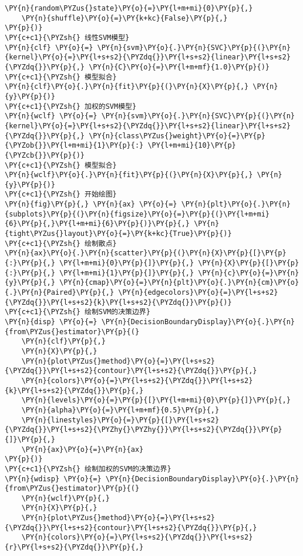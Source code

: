 \begin{Verbatim}[commandchars=\\\{\}]
    \PY{n}{random\PYZus{}state}\PY{o}{=}\PY{l+m+mi}{0}\PY{p}{,}
    \PY{n}{shuffle}\PY{o}{=}\PY{k+kc}{False}\PY{p}{,}
\PY{p}{)}
\PY{c+c1}{\PYZsh{} 线性SVM模型}
\PY{n}{clf} \PY{o}{=} \PY{n}{svm}\PY{o}{.}\PY{n}{SVC}\PY{p}{(}\PY{n}{kernel}\PY{o}{=}\PY{l+s+s2}{\PYZdq{}}\PY{l+s+s2}{linear}\PY{l+s+s2}{\PYZdq{}}\PY{p}{,} \PY{n}{C}\PY{o}{=}\PY{l+m+mf}{1.0}\PY{p}{)}
\PY{c+c1}{\PYZsh{} 模型拟合}
\PY{n}{clf}\PY{o}{.}\PY{n}{fit}\PY{p}{(}\PY{n}{X}\PY{p}{,} \PY{n}{y}\PY{p}{)}
\PY{c+c1}{\PYZsh{} 加权的SVM模型}
\PY{n}{wclf} \PY{o}{=} \PY{n}{svm}\PY{o}{.}\PY{n}{SVC}\PY{p}{(}\PY{n}{kernel}\PY{o}{=}\PY{l+s+s2}{\PYZdq{}}\PY{l+s+s2}{linear}\PY{l+s+s2}{\PYZdq{}}\PY{p}{,} \PY{n}{class\PYZus{}weight}\PY{o}{=}\PY{p}{\PYZob{}}\PY{l+m+mi}{1}\PY{p}{:} \PY{l+m+mi}{10}\PY{p}{\PYZcb{}}\PY{p}{)}
\PY{c+c1}{\PYZsh{} 模型拟合}
\PY{n}{wclf}\PY{o}{.}\PY{n}{fit}\PY{p}{(}\PY{n}{X}\PY{p}{,} \PY{n}{y}\PY{p}{)}
\PY{c+c1}{\PYZsh{} 开始绘图}
\PY{n}{fig}\PY{p}{,} \PY{n}{ax} \PY{o}{=} \PY{n}{plt}\PY{o}{.}\PY{n}{subplots}\PY{p}{(}\PY{n}{figsize}\PY{o}{=}\PY{p}{(}\PY{l+m+mi}{6}\PY{p}{,}\PY{l+m+mi}{6}\PY{p}{)}\PY{p}{,} \PY{n}{tight\PYZus{}layout}\PY{o}{=}\PY{k+kc}{True}\PY{p}{)}
\PY{c+c1}{\PYZsh{} 绘制散点}
\PY{n}{ax}\PY{o}{.}\PY{n}{scatter}\PY{p}{(}\PY{n}{X}\PY{p}{[}\PY{p}{:}\PY{p}{,} \PY{l+m+mi}{0}\PY{p}{]}\PY{p}{,} \PY{n}{X}\PY{p}{[}\PY{p}{:}\PY{p}{,} \PY{l+m+mi}{1}\PY{p}{]}\PY{p}{,} \PY{n}{c}\PY{o}{=}\PY{n}{y}\PY{p}{,} \PY{n}{cmap}\PY{o}{=}\PY{n}{plt}\PY{o}{.}\PY{n}{cm}\PY{o}{.}\PY{n}{Paired}\PY{p}{,} \PY{n}{edgecolors}\PY{o}{=}\PY{l+s+s2}{\PYZdq{}}\PY{l+s+s2}{k}\PY{l+s+s2}{\PYZdq{}}\PY{p}{)}
\PY{c+c1}{\PYZsh{} 绘制SVM的决策边界}
\PY{n}{disp} \PY{o}{=} \PY{n}{DecisionBoundaryDisplay}\PY{o}{.}\PY{n}{from\PYZus{}estimator}\PY{p}{(}
    \PY{n}{clf}\PY{p}{,}
    \PY{n}{X}\PY{p}{,}
    \PY{n}{plot\PYZus{}method}\PY{o}{=}\PY{l+s+s2}{\PYZdq{}}\PY{l+s+s2}{contour}\PY{l+s+s2}{\PYZdq{}}\PY{p}{,}
    \PY{n}{colors}\PY{o}{=}\PY{l+s+s2}{\PYZdq{}}\PY{l+s+s2}{k}\PY{l+s+s2}{\PYZdq{}}\PY{p}{,}
    \PY{n}{levels}\PY{o}{=}\PY{p}{[}\PY{l+m+mi}{0}\PY{p}{]}\PY{p}{,}
    \PY{n}{alpha}\PY{o}{=}\PY{l+m+mf}{0.5}\PY{p}{,}
    \PY{n}{linestyles}\PY{o}{=}\PY{p}{[}\PY{l+s+s2}{\PYZdq{}}\PY{l+s+s2}{\PYZhy{}\PYZhy{}}\PY{l+s+s2}{\PYZdq{}}\PY{p}{]}\PY{p}{,}
    \PY{n}{ax}\PY{o}{=}\PY{n}{ax}
\PY{p}{)}
\PY{c+c1}{\PYZsh{} 绘制加权的SVM的决策边界}
\PY{n}{wdisp} \PY{o}{=} \PY{n}{DecisionBoundaryDisplay}\PY{o}{.}\PY{n}{from\PYZus{}estimator}\PY{p}{(}
    \PY{n}{wclf}\PY{p}{,}
    \PY{n}{X}\PY{p}{,}
    \PY{n}{plot\PYZus{}method}\PY{o}{=}\PY{l+s+s2}{\PYZdq{}}\PY{l+s+s2}{contour}\PY{l+s+s2}{\PYZdq{}}\PY{p}{,}
    \PY{n}{colors}\PY{o}{=}\PY{l+s+s2}{\PYZdq{}}\PY{l+s+s2}{r}\PY{l+s+s2}{\PYZdq{}}\PY{p}{,}

\end{Verbatim}

